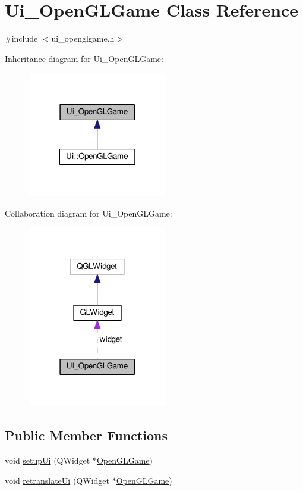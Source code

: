 \hypertarget{classUi__OpenGLGame}{\section{Ui\-\_\-\-Open\-G\-L\-Game Class Reference}
\label{classUi__OpenGLGame}
}


{\ttfamily \#include $<$ui\-\_\-openglgame.\-h$>$}



Inheritance diagram for Ui\-\_\-\-Open\-G\-L\-Game\-:\nopagebreak
\begin{figure}[H]
\begin{center}
\leavevmode
\includegraphics[width=174pt]{classUi__OpenGLGame__inherit__graph}
\end{center}
\end{figure}


Collaboration diagram for Ui\-\_\-\-Open\-G\-L\-Game\-:\nopagebreak
\begin{figure}[H]
\begin{center}
\leavevmode
\includegraphics[width=174pt]{classUi__OpenGLGame__coll__graph}
\end{center}
\end{figure}
\subsection*{Public Member Functions}
\begin{DoxyCompactItemize}
\item 
void \hyperlink{classUi__OpenGLGame_a0a1f93aa9935d6ccf076548c88c7148c}{setup\-Ui} (Q\-Widget $\ast$\hyperlink{classOpenGLGame}{Open\-G\-L\-Game})
\item 
void \hyperlink{classUi__OpenGLGame_a0b0d78aa29b7225c7ec3b22ed62dad45}{retranslate\-Ui} (Q\-Widget $\ast$\hyperlink{classOpenGLGame}{Open\-G\-L\-Game})
\end{DoxyCompactItemize}
